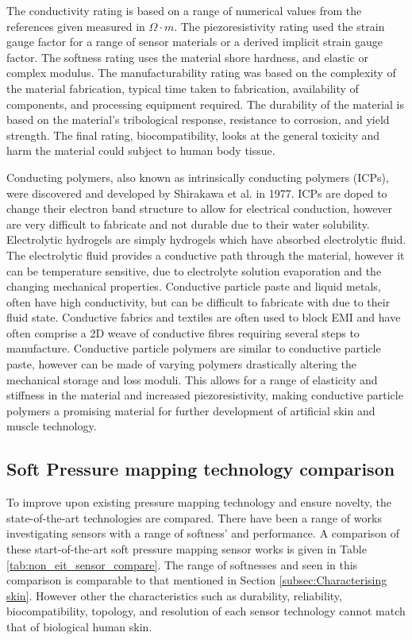 The conductivity rating is based on a range of numerical values from the references given measured in $\Omega\cdot m$. The piezoresistivity rating used the strain gauge factor for a range of sensor materials or a derived implicit strain gauge factor. The softness rating uses the material shore hardness, and elastic or complex modulus. The manufacturability rating was based on the complexity of the material fabrication, typical time taken to fabrication, availability of components, and processing equipment required. The durability of the material is based on the material's tribological response, resistance to corrosion, and yield strength. The final rating, biocompatibility, looks at the general toxicity and harm the material could subject to human body tissue.

Conducting polymers, also known as intrinsically conducting polymers (ICPs), were discovered and developed by Shirakawa et al. \cite{Shirakawa1977} in 1977. ICPs are doped to change their electron band structure to allow for electrical conduction, however are very difficult to fabricate and not durable due to their water solubility. Electrolytic hydrogels are simply hydrogels which have absorbed electrolytic fluid. The electrolytic fluid provides a conductive path through the material, however it can be temperature sensitive, due to electrolyte solution evaporation and the changing mechanical properties. Conductive particle paste and liquid metals, often have high conductivity, but can be difficult to fabricate with due to their fluid state. Conductive fabrics and textiles are often used to block EMI and have often comprise a  2D weave of conductive fibres requiring several steps to manufacture. Conductive particle polymers are similar to conductive particle paste, however can be made of varying polymers drastically altering the mechanical storage and loss moduli. This allows for a range of elasticity and stiffness in the material and increased piezoresistivity, making conductive particle polymers a promising material for further development of artificial skin and muscle technology. 


\subsection{Soft Pressure mapping technology comparison}
To improve upon existing pressure mapping technology and ensure novelty, the state-of-the-art technologies are compared. There have been a range of works investigating sensors with a range of softness' and performance. A comparison of these start-of-the-art soft pressure mapping sensor works is given in Table \ref{tab:non_eit_sensor_compare}.  The range of softnesses and seen in this comparison is comparable to that mentioned in Section \ref{subsec:Characterising skin}. However other the characteristics such as durability, reliability, biocompatibility, topology, and resolution of each sensor technology cannot match that of biological human skin.

